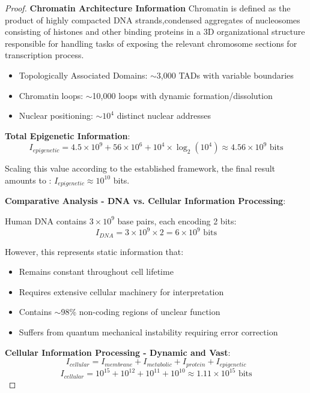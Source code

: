 \documentclass[12pt,a4paper]{article}
\begin{document}
\begin{proof}
\textbf{Chromatin Architecture Information}\newline
Chromatin is defined as the product of highly compacted DNA strands,condensed aggregates of nucleosomes consisting of  histones and other binding proteins in a 3D organizational structure responsible for handling tasks of exposing the relevant chromosome sections for transcription process.
\begin{itemize}
\item Topologically Associated Domains: $\sim$3,000 TADs with variable boundaries
\item Chromatin loops: $\sim$10,000 loops with dynamic formation/dissolution  
\item Nuclear positioning: $\sim10^4$ distinct nuclear addresses
\end{itemize}

\textbf{Total Epigenetic Information}:
\begin{equation}
I_{epigenetic} = 4.5 \times 10^9 + 56 \times 10^6 + 10^4 \times \log_2(10^4) \approx 4.56 \times 10^9 \text{ bits}
\end{equation}

Scaling this value according to the established framework, the final result amounts to : $I_{epigenetic} \approx 10^{10}$ bits.\newline

\textbf{Comparative Analysis - DNA vs. Cellular Information Processing}:

 Human DNA contains $3 \times 10^9$ base pairs, each encoding 2 bits:
\begin{equation}
I_{DNA} = 3 \times 10^9 \times 2 = 6 \times 10^9 \text{ bits}
\end{equation}

However, this represents static information that:
\begin{itemize}
\item Remains constant throughout cell lifetime
\item Requires extensive cellular machinery for interpretation
\item Contains $\sim$98\% non-coding regions of unclear function
\item Suffers from quantum mechanical instability requiring error correction
\end{itemize}

\textbf{Cellular Information Processing - Dynamic and Vast}:
\begin{equation}
I_{cellular} = I_{membrane} + I_{metabolic} + I_{protein} + I_{epigenetic}
\end{equation}
\begin{equation}
I_{cellular} = 10^{15} + 10^{12} + 10^{11} + 10^{10} \approx 1.11 \times 10^{15} \text{ bits}
\end{equation}


\end{proof}
\end{document}
